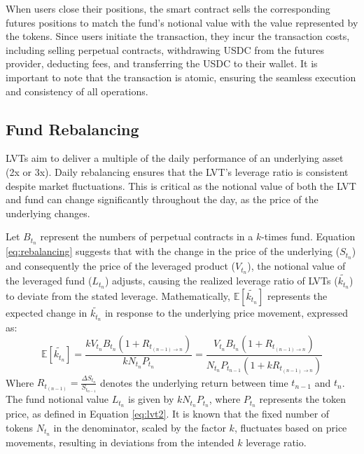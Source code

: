 When users close their positions, the smart contract sells the corresponding futures positions to match the fund's notional value with the value represented by the tokens. Since users initiate the transaction, they incur the transaction costs, including selling perpetual contracts, withdrawing USDC from the futures provider, deducting fees, and transferring the USDC to their wallet. It is important to note that the transaction is atomic, ensuring the seamless execution and consistency of all operations.

\subsection{Fund Rebalancing} \label{appx:rebalancing}
LVTs aim to deliver a multiple of the daily performance of an underlying asset (\eg 2x or 3x). Daily rebalancing ensures that the LVT's leverage ratio is consistent despite market fluctuations. This is critical as the notional value of both the LVT and fund can change significantly throughout the day, as the price of the underlying changes. 

Let $B_{t_{n}}$ represent the numbers of perpetual contracts in a \(k\)-times fund. Equation \ref{eq:rebalancing} suggests that with the change in the price of the underlying ($S_{t_{n}}$) and consequently the price of the leveraged product ($V_{t_{n}}$), the notional value of the leveraged fund ($L_{t_{n}}$) adjusts, causing the realized leverage ratio of LVTs ($\tilde{k_{t_{n}}}$) to deviate from the stated leverage. Mathematically, $\mathbb{E}[\tilde{k_{t_{n}}}]$ represents the expected change in $\tilde{k_{t_{n}}}$ in response to the underlying price movement, expressed as:
\begin{equation}\label{eq:rebalancing}
	\mathbb{E}[\tilde{k_{t_{n}}}]=\frac{kV_{t_{n}}B_{t_{n}}(1+R_{t_{(n-1)\to n}})}{kN_{t_{n}}P_{t_{n}}}=\frac{V_{t_{n}}B_{t_{n}}(1+R_{t_{(n-1)\to n}})}{N_{t_{n}}P_{t_{n-1}}(1+kR_{t_{(n-1)\to n}})}
\end{equation}
Where \(R_{t_{(n-1)}} = \frac{\Delta S_{t_{n}}}{S_{t_{n-1}}}\) denotes the underlying return between time \(t_{n-1}\) and \(t_{n}\). The fund notional value \(L_{t_{n}}\) is given by \(kN_{t_{n}}P_{t_{n}}\), where \(P_{t_{n}}\) represents the token price, as defined in Equation \ref{eq:lvt2}. It is known that the fixed number of tokens \(N_{t_{n}}\) in the denominator, scaled by the factor \(k\), fluctuates based on price movements, resulting in deviations from the intended \(k\) leverage ratio.

